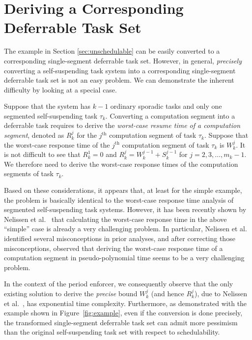 \clearpage

\section{Deriving a Corresponding Deferrable Task Set}
\label{sec:convert}

The example in Section \ref{sec:unschedulable} can be easily converted to a corresponding single-segment deferrable task set. However, in general,  \emph{precisely} converting a self-suspending task system into a corresponding single-segment  deferrable task set is not an easy problem. We can demonstrate the inherent difficulty by looking at a special case.

Suppose that the system has $k-1$ ordinary sporadic tasks and only one segmented self-suspending task $\tau_k$. Converting a computation segment into a deferrable task requires to derive the \emph{worst-case resume time of a computation segment}, denoted as $R_k^j$ for the $j^{\mathrm{th}}$ computation segment of task $\tau_k$. Suppose that the worst-case response time of the $j^{\mathrm{th}}$ computation segment of task $\tau_k$ is $W_k^j$. It is not difficult to see that $R_k^1=0$ and $R_k^j = W_k^{j-1}+S_k^{j-1}$ for $j=2,3,\ldots,m_k-1$. We therefore need to derive the worst-case response times of the computation segments of task $\tau_k$. 

Based on these considerations, it appears that, at least for the simple example,  the problem is basically identical to the worst-case response time analysis of segmented self-suspending task systems.  However, it has been recently shown by Nelissen et al.\ \cite{ecrts15nelissen} that calculating the worst-case response time in the above ``simple'' case is already a very challenging problem. In particular, Nelissen et al.\ \cite{ecrts15nelissen} identified several misconceptions in prior analyses, and after correcting those misconceptions, observed that deriving the worst-case response time of a computation segment in pseudo-polynomial time seems to be a very challenging problem. 



In the context of the period enforcer, we consequently observe that the only existing solution to derive the \emph{precise} bound $W_k^{j}$ (and hence $R_k^j$), due to Nelissen et al.\ \cite{ecrts15nelissen},  has exponential time complexity. Furthermore, as demonstrated with the example shown in Figure~\ref{fig:example}, even if the conversion is done precisely, the transformed single-segment deferrable task set can admit more pessimism than the original self-suspending task set with respect to schedulability.

